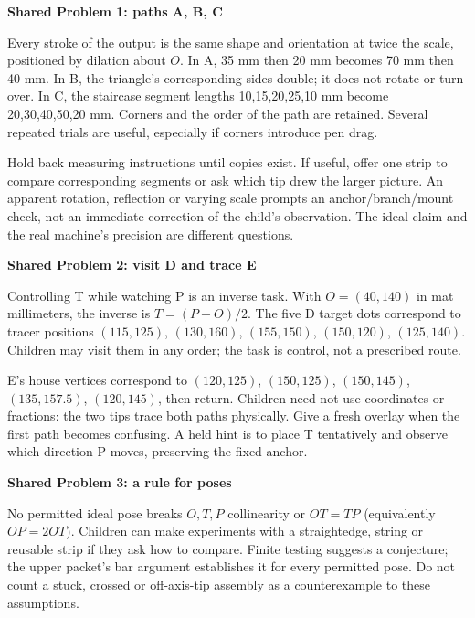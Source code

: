 \documentclass[11pt,letterpaper]{article}
\newcommand{\sub}[1]{\par\textbf{#1}\par}
\begin{document}
\sub{Shared Problem 1: paths A, B, C}
Every stroke of the output is the same shape and orientation at twice the scale, positioned by dilation about $O$. In A, 35 mm then 20 mm becomes 70 mm then 40 mm. In B, the triangle's corresponding sides double; it does not rotate or turn over. In C, the staircase segment lengths 10,15,20,25,10 mm become 20,30,40,50,20 mm. Corners and the order of the path are retained. Several repeated trials are useful, especially if corners introduce pen drag.

Hold back measuring instructions until copies exist. If useful, offer one strip to compare corresponding segments or ask which tip drew the larger picture. An apparent rotation, reflection or varying scale prompts an anchor/branch/mount check, not an immediate correction of the child's observation. The ideal claim and the real machine's precision are different questions.

\sub{Shared Problem 2: visit D and trace E}
Controlling T while watching P is an inverse task. With $O=(40,140)$ in mat millimeters, the inverse is $T=(P+O)/2$. The five D target dots correspond to tracer positions $(115,125)$, $(130,160)$, $(155,150)$, $(150,120)$, $(125,140)$. Children may visit them in any order; the task is control, not a prescribed route.

E's house vertices correspond to $(120,125)$, $(150,125)$, $(150,145)$, $(135,157.5)$, $(120,145)$, then return. Children need not use coordinates or fractions: the two tips trace both paths physically. Give a fresh overlay when the first path becomes confusing. A held hint is to place T tentatively and observe which direction P moves, preserving the fixed anchor.

\sub{Shared Problem 3: a rule for poses}
No permitted ideal pose breaks $O,T,P$ collinearity or $OT=TP$ (equivalently $OP=2OT$). Children can make experiments with a straightedge, string or reusable strip if they ask how to compare. Finite testing suggests a conjecture; the upper packet's bar argument establishes it for every permitted pose. Do not count a stuck, crossed or off-axis-tip assembly as a counterexample to these assumptions.
\end{document}

